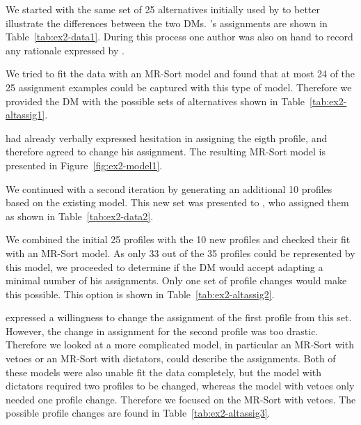 We started with the same set of 25 alternatives initially used by \GJ to better illustrate the differences between the two DMs. \DB's assignments are shown in Table~\ref{tab:ex2-data1}. During this process one author was also on hand to record any rationale expressed by \DB.



We tried to fit the data with an MR-Sort model and found that at most 24 of the 25 assignment examples could be captured with this type of model. Therefore we provided the DM with the possible sets of alternatives shown in Table~\ref{tab:ex2-altassig1}.



\DB had already verbally expressed hesitation in assigning the eigth profile, and therefore agreed to change his assignment. The resulting MR-Sort model is presented in Figure~\ref{fig:ex2-model1}.



We continued with a second iteration by generating an additional 10 profiles based on the existing model. This new set was presented to \DB, who assigned them as shown in Table~\ref{tab:ex2-data2}.



We combined the initial 25 profiles with the 10 new profiles and checked their fit with an MR-Sort model. As only 33 out of the 35 profiles could be represented by this model, we proceeded to determine if the DM would accept adapting a minimal number of his assignments. Only one set of profile changes would make this possible. This option is shown in Table~\ref{tab:ex2-altassig2}.



\DB expressed a willingness to change the assignment of the first profile from this set. However, the change in assignment for the second profile was too drastic. Therefore we looked at a more complicated model, in particular an MR-Sort with vetoes or an MR-Sort with dictators, could describe the assignments. Both of these models were also unable fit the data completely, but the model with dictators required two profiles to be changed, whereas the model with vetoes only needed one profile change. Therefore we focused on the MR-Sort with vetoes. The possible profile changes are found in Table~\ref{tab:ex2-altassig3}.





